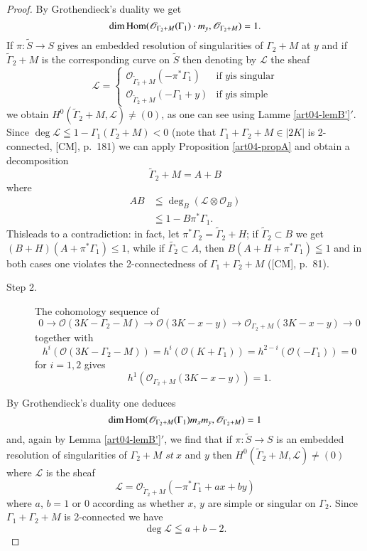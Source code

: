 \begin{proof}
By Grothendieck's duality we get
$$
\dim \operatorname{Hom} (\mathscr{O}_{\Gamma_{2}+M}(\Gamma_{1})\cdot m_{y}, \mathscr{O}_{\Gamma_{2}+M})=1.
$$
If $\pi:\widetilde{S}\to S$ gives an embedded resolution of
singularities of $\Gamma_{2}+M$ at $y$ and if
$\widetilde{\Gamma}_{2}+M$ is the corresponding curve on
$\widetilde{S}$ then denoting by $\mathscr{L}$ the sheaf
$$
\mathscr{L}=
\begin{cases}
\mathscr{O}_{\widetilde{\Gamma}_{2}+M}(-\pi^{*}\Gamma_{1}) & \text{if $y$
is singular}\\
\mathscr{O}_{\widetilde{\Gamma}_{2}+M}(-\Gamma_{1}+y) & \text{if $y$
is simple}
\end{cases}
$$
we obtain $H^{0}(\widetilde{\Gamma}_{2}+M,\mathscr{L})\neq (0)$, as one can
see using Lamme \ref{art04-lemB'}$'$. Since $\deg \mathscr{L}\leqq
1-\Gamma_{1}(\Gamma_{2}+M)<0$ (note that $\Gamma_{1}+\Gamma_{2}+M\in
|2K|$ is 2-connected,  [CM], p.~181) we can apply
Proposition \ref{art04-propA} and obtain a decomposition
$$
\widetilde{\Gamma}_{2}+M=A+B
$$
where
\begin{align*}
AB & \leqq \deg_{B}(\mathscr{L}\otimes \mathscr{O}_{B})\\
 & \leqq 1-B\pi^{*}\Gamma_{1}.
\end{align*}
This\pageoriginale leads to a contradiction: in fact, let
$\pi^{*}\Gamma_{2}=\widetilde{\Gamma}_{2}+H$; if $\widetilde{\Gamma}_{2}\subset
B$ we get $(B+H)(A+\pi^{*}\Gamma_{1})\leq 1$, while if
$\widetilde{\Gamma_2}\subset A$, then $B(A+H+\pi^{*}\Gamma_{1})\leqq 1$ and
in both cases one violates the 2-connectedness of
$\Gamma_{1}+\Gamma_{2}+M$ ([CM], p.~81).

\begin{description}
\item[Step 2.] The cohomology sequence of
{\fontsize{10pt}{12pt}\selectfont
$$
0\to \mathscr{O}(3K-\Gamma_{2}-M)\to \mathscr{O}(3K-x-y)\to \mathscr{O}_{\Gamma_{2}+M}(3K-x-y)\to 0
$$}
together with
$$
h^{i}(\mathscr{O}(3K-\Gamma_{2}-M))=h^{i}(\mathscr{O}(K+\Gamma_{1}))=h^{2-i}(\mathscr{O}(-\Gamma_{1}))=0
$$
for $i=1,2$ gives
$$
h^{1}(\mathscr{O}_{\Gamma_{2}+M}(3K-x-y))=1.
$$
\end{description}

By Grothendieck's duality one deduces
$$
\dim\operatorname{Hom}(\mathscr{O}_{\Gamma_{2}+M}(\Gamma_{1})m_{x}m_{y}, \mathscr{O}_{\Gamma_{2}+M})=1 
$$
and, again by Lemma \ref{art04-lemB'}$'$, we find that if
$\pi:\widetilde{S}\to S$ is an embedded resolution of singularities of
$\Gamma_{2}+M$  $st \ x$ and $y$ then
$H^{0}(\widetilde{\Gamma}_{2}+M,\mathscr{L})\neq (0)$ where $\mathscr{L}$
is the sheaf
$$
\mathscr{L}=\mathscr{O}_{\widetilde{\Gamma}_{2}+M}(-\pi^{*}\Gamma_{1}+ax+by)
$$
where $a$, $b=1$ or $0$ according as whether $x$, $y$ are simple or
singular on $\Gamma_{2}$. Since $\Gamma_{1}+\Gamma_{2}+M$ is
2-connected we have
$$
\deg \mathscr{L}\leqq a+b-2.
$$


\end{proof}
